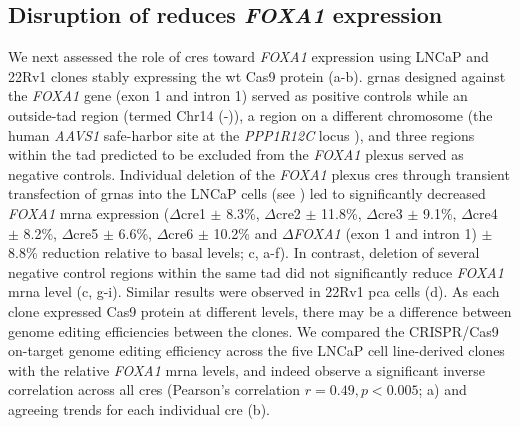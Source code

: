 \subsection{Disruption of  reduces \emph{FOXA1}  expression}

We next assessed the role of \glspl{cre} toward \emph{FOXA1} expression using LNCaP and 22Rv1 clones stably expressing the \gls{wt} Cas9 protein (a-b).
\Glspl{grna} designed against the \emph{FOXA1} gene (exon 1 and intron 1) served as positive controls while an outside-\gls{tad} region (termed Chr14 (-)), a region on a different chromosome (the human \emph{AAVS1} safe-harbor site at the \emph{PPP1R12C} locus \cite{kronTMPRSS2ERGFusion2017,dekelverFunctionalGenomicsProteomics2010}), and three regions within the \gls{tad} predicted to be excluded from the \emph{FOXA1} plexus served as negative controls.
Individual deletion of the \emph{FOXA1} plexus \glspl{cre} through transient transfection of \glspl{grna} into the LNCaP cells (see ) led to significantly decreased \emph{FOXA1} \gls{mrna} expression ($\Delta$\gls{cre}1  $\pm$ 8.3\%, $\Delta$\gls{cre}2  $\pm$ 11.8\%, $\Delta$\gls{cre}3  $\pm$ 9.1\%, $\Delta$\gls{cre}4  $\pm$ 8.2\%, $\Delta$\gls{cre}5  $\pm$ 6.6\%, $\Delta$\gls{cre}6  $\pm$ 10.2\% and $\Delta$\emph{FOXA1} (exon 1 and intron 1)  $\pm$ 8.8\% reduction relative to basal levels; c, a-f).
In contrast, deletion of several negative control regions within the same \gls{tad} did not significantly reduce \emph{FOXA1} \gls{mrna} level (c, g-i).
Similar results were observed in 22Rv1 \gls{pca} cells (d).
As each clone expressed Cas9 protein at different levels, there may be a difference between genome editing efficiencies between the clones.
We compared the CRISPR/Cas9 on-target genome editing efficiency across the five LNCaP cell line-derived clones with the relative \emph{FOXA1} \gls{mrna} levels, and indeed observe a significant inverse correlation across all \glspl{cre} (Pearson's correlation $r = 0.49, p < 0.005$; a) and agreeing trends for each individual \gls{cre} (b).


